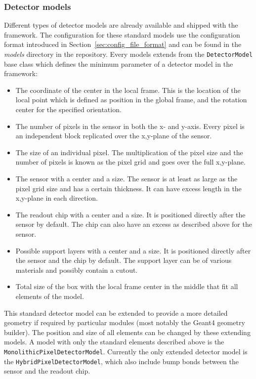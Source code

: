 \subsubsection{Detector models}
\label{sec:detector_models}
Different types of detector models are already available and shipped with the framework.
The configuration for these standard models use the configuration format introduced in Section~\ref{sec:config_file_format} and can be found in the \textit{models} directory in the repository.
Every models extends from the \texttt{DetectorModel} base class which defines the minimum parameter of a detector model in the framework:
\begin{itemize}
\item The coordinate of the center in the local frame.
This is the location of the local point which is defined as position in the global frame, and the rotation center for the specified orientation.
\item The number of pixels in the sensor in both the x- and y-axis.
Every pixel is an independent block replicated over the x,y-plane of the sensor.
\item The size of an individual pixel.
The multiplication of the pixel size and the number of pixels is known as the pixel grid and goes over the full x,y-plane.
\item The sensor with a center and a size.
The sensor is at least as large as the pixel grid size and has a certain thickness.
It can have excess length in the x,y-plane in each direction.
\item The readout chip with a center and a size.
It is positioned directly after the sensor by default.
The chip can also have an excess as described above for the sensor.
\item Possible support layers with a center and a size.
It is positioned directly after the sensor and the chip by default.
The support layer can be of various materials and possibly contain a cutout.
\item Total size of the box with the local frame center in the middle that fit all elements of the model.
\end{itemize}
This standard detector model can be extended to provide a more detailed geometry if required by particular modules (most notably the Geant4 geometry builder).
The position and size of all elements can be changed by these extending models.
A model with only the standard elements described above is the \texttt{MonolithicPixelDetectorModel}.
Currently the only extended detector model is the \texttt{HybridPixelDetectorModel}, which also include bump bonds between the sensor and the readout chip.

